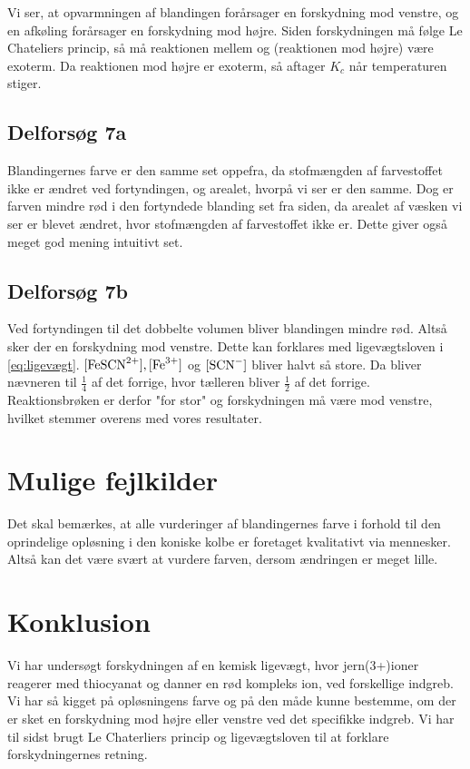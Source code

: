 \documentclass{report}
\begin{document}
Vi ser, at opvarmningen af blandingen forårsager en forskydning mod venstre, og en afkøling forårsager en forskydning mod højre.
Siden forskydningen må følge Le Chateliers princip, så må reaktionen mellem  og  (reaktionen mod højre) være exoterm.
Da reaktionen mod højre er exoterm, så aftager $K_c$ når temperaturen stiger.
\subsection*{Delforsøg 7a}
Blandingernes farve er den samme set oppefra, da stofmængden af farvestoffet ikke er ændret ved fortyndingen, og arealet, hvorpå vi ser er den samme.
Dog er farven mindre rød i den fortyndede blanding set fra siden, da arealet af væsken vi ser er blevet ændret, hvor stofmængden af farvestoffet ikke er.
Dette giver også meget god mening intuitivt set.
\subsection*{Delforsøg 7b}
Ved fortyndingen til det dobbelte volumen bliver blandingen mindre rød.
Altså sker der en forskydning mod venstre.
Dette kan forklares med ligevægtsloven i \ref{eq:ligevægt}.
$[\ce{FeSCN^2+}], [\ce{Fe^3+}]$ og $[\ce{SCN-}]$ bliver halvt så store.
Da bliver nævneren til $\frac{1}{4}$ af det forrige, hvor tælleren bliver $\frac{1}{2}$ af det forrige.
Reaktionsbrøken er derfor "for stor" og forskydningen må være mod venstre, hvilket stemmer overens med vores resultater.
\section*{Mulige fejlkilder}
Det skal bemærkes, at alle vurderinger af blandingernes farve i forhold til den oprindelige opløsning i den koniske kolbe er foretaget kvalitativt via mennesker.
Altså kan det være svært at vurdere farven, dersom ændringen er meget lille.
\section*{Konklusion}
Vi har undersøgt forskydningen af en kemisk ligevægt, hvor jern(3+)ioner reagerer med thiocyanat og danner en rød kompleks ion, ved forskellige indgreb.
Vi har så kigget på opløsningens farve og på den måde kunne bestemme, om der er sket en forskydning mod højre eller venstre ved det specifikke indgreb.
Vi har til sidst brugt Le Chaterliers princip og ligevægtsloven til at forklare forskydningernes retning.
\end{document}
